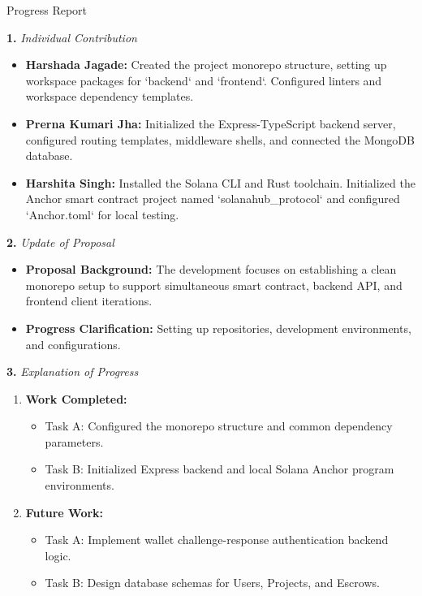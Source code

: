 \documentclass[12pt]{article}
\newcommand{\progressreport}{{\large Progress Report}\par\vspace{4pt}}
\newcommand{\subhead}[2]{\textbf{#1.} \textit{#2}\par}
\begin{document}
\progressreport

\subhead{1}{Individual Contribution}
\begin{itemize}[leftmargin=2em]
    \item \textbf{Harshada Jagade:} Created the project monorepo structure, setting up workspace packages for `backend` and `frontend`. Configured linters and workspace dependency templates.
    \item \textbf{Prerna Kumari Jha:} Initialized the Express-TypeScript backend server, configured routing templates, middleware shells, and connected the MongoDB database.
    \item \textbf{Harshita Singh:} Installed the Solana CLI and Rust toolchain. Initialized the Anchor smart contract project named `solanahub\_protocol` and configured `Anchor.toml` for local testing.
\end{itemize}

\subhead{2}{Update of Proposal}
\begin{itemize}[leftmargin=2em]
    \item \textbf{Proposal Background:} The development focuses on establishing a clean monorepo setup to support simultaneous smart contract, backend API, and frontend client iterations.
    \item \textbf{Progress Clarification:} Setting up repositories, development environments, and configurations.
\end{itemize}

\newpage

\subhead{3}{Explanation of Progress}
\begin{enumerate}[leftmargin=2em]
    \item \textbf{Work Completed:}
    \begin{itemize}[leftmargin=2em]
        \item Task A: Configured the monorepo structure and common dependency parameters.
        \item Task B: Initialized Express backend and local Solana Anchor program environments.
    \end{itemize}
    \item \textbf{Future Work:}
    \begin{itemize}[leftmargin=2em]
        \item Task A: Implement wallet challenge-response authentication backend logic.
        \item Task B: Design database schemas for Users, Projects, and Escrows.
    \end{itemize}
\end{enumerate}
\end{document}
